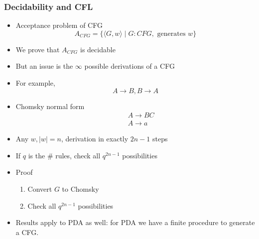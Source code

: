 




\begin{frame}[allowframebreaks] \frametitle{Decidability and CFL}
  \begin{itemize}
\item Acceptance problem of CFG
  \begin{equation*}
    A_{CFG}
=\{\langle  G,w\rangle \mid
G: CFG,\mbox{ generates } w\}
  \end{equation*}
\item We prove that $A_{CFG}$ is decidable
\item But an issue is the $\infty$ possible derivations of a CFG

\item For example,
  \begin{equation*}
  A\rightarrow B, B \rightarrow A
\end{equation*}

\item Chomsky normal form
  \begin{eqnarray*}
    && A \rightarrow BC\\
&& A \rightarrow a
  \end{eqnarray*}

\item Any $w, |w|=n$, derivation in 
exactly $2n-1$ steps

\item If $q$ is the \# rules, check all $q^{2n-1}$ possibilities

\item Proof
  \begin{enumerate}
  \item Convert $G$ to Chomsky
  \item Check all $q^{2n-1}$ possibilities
  \end{enumerate}

\item Results apply to PDA as well: for PDA we have a finite
  procedure to generate a CFG.
\end{itemize}\end{frame}

